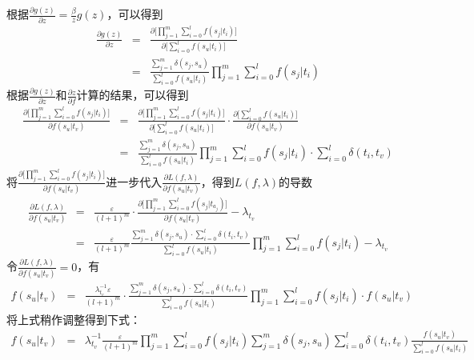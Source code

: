 \parinterval 根据$\frac{\partial g(z)}{\partial z} = \frac{\beta}{z} g(z)$，可以得到
\vspace{-0.5em}
\begin{eqnarray}
\frac{\partial g(z)}{\partial z}& =& \frac{\partial \big[ \prod\limits_{j=1}^{m} \sum\limits_{i=0}^{l} f(s_j|t_i) \big]}{\partial \big[ \sum\limits_{i=0}^{l}f(s_u|t_i) \big]}\nonumber \\
 &=& \frac{\sum\limits_{j=1}^{m} \delta(s_j,s_u)}{\sum\limits_{i=0}^{l}f(s_u|t_i)} \prod\limits_{j=1}^{m} \sum\limits_{i=0}^{l} f(s_j|t_i)
\label{eq:5-33}
\end{eqnarray}
\parinterval 根据$\frac{\partial g(z)}{\partial z}$和$\frac{\partial z}{\partial f}$计算的结果，可以得到
\vspace{-0.5em}
\begin{eqnarray}
{\frac{\partial \big[ \prod_{j=1}^{m} \sum_{i=0}^{l} f(s_j|t_i) \big]}{\partial f(s_u|t_v)}}& =& {{\frac{\partial \big[ \prod\limits_{j=1}^{m} \sum\limits_{i=0}^{l} f(s_j|t_i) \big]}{\partial \big[ \sum\limits_{i=0}^{l}f(s_u|t_i) \big]}} \cdot{\frac{\partial \big[ \sum\limits_{i=0}^{l}f(s_u|t_i) \big]}{\partial f(s_u|t_v)}}} \nonumber \\
& = &{\frac{\sum\limits_{j=1}^{m} \delta(s_j,s_u)}{\sum\limits_{i=0}^{l}f(s_u|t_i)} \prod\limits_{j=1}^{m} \sum\limits_{i=0}^{l} f(s_j|t_i) \cdot \sum\limits_{i=0}^{l} \delta(t_i,t_v)}
\label{eq:5-34}
\end{eqnarray}
\parinterval 将$\frac{\partial \big[ \prod_{j=1}^{m} \sum_{i=0}^{l} f(s_j|t_i) \big]}{\partial f(s_u|t_v)}$进一步代入$\frac{\partial L(f,\lambda)}{\partial f(s_u|t_v)}$，得到$L(f,\lambda)$的导数
\vspace{-0.5em}
\begin{eqnarray}
{\frac{\partial L(f,\lambda)}{\partial f(s_u|t_v)}} &=&{\frac{\varepsilon}{(l+1)^{m}} \cdot \frac{\partial \big[ \prod\limits_{j=1}^{m} \sum\limits_{i=0}^{l} f(s_j|t_{a_j}) \big]}{\partial f(s_u|t_v)} - \lambda_{t_v}}\nonumber \\
&=&{\frac{\varepsilon}{(l+1)^{m}} \frac{\sum_{j=1}^{m} \delta(s_j,s_u) \cdot \sum_{i=0}^{l} \delta(t_i,t_v)}{\sum_{i=0}^{l}f(s_u|t_i)} \prod\limits_{j=1}^{m} \sum\limits_{i=0}^{l} f(s_j|t_i) - \lambda_{t_v}}
\label{eq:5-35}
\end{eqnarray}
\parinterval 令$\frac{\partial L(f,\lambda)}{\partial f(s_u|t_v)}=0$，有
\vspace{-1em}
\begin{eqnarray}
f(s_u|t_v) &=& \frac{\lambda_{t_v}^{-1} \varepsilon}{(l+1)^{m}} \cdot \frac{\sum\limits_{j=1}^{m} \delta(s_j,s_u) \cdot \sum\limits_{i=0}^{l} \delta(t_i,t_v)}{\sum\limits_{i=0}^{l}f(s_u|t_i)} \prod\limits_{j=1}^{m} \sum\limits_{i=0}^{l} f(s_j|t_i) \cdot f(s_u|t_v)
\label{eq:5-36}
\end{eqnarray}
\parinterval 将上式稍作调整得到下式：
\vspace{-1em}
\begin{eqnarray}
f(s_u|t_v) &=& \lambda_{t_v}^{-1} \frac{\varepsilon}{(l+1)^{m}} \prod\limits_{j=1}^{m} \sum\limits_{i=0}^{l} f(s_j|t_i) \sum\limits_{j=1}^{m} \delta(s_j,s_u) \sum\limits_{i=0}^{l} \delta(t_i,t_v) \frac{f(s_u|t_v) }{\sum\limits_{i=0}^{l}f(s_u|t_i)}
\label{eq:5-37}
\end{eqnarray}

